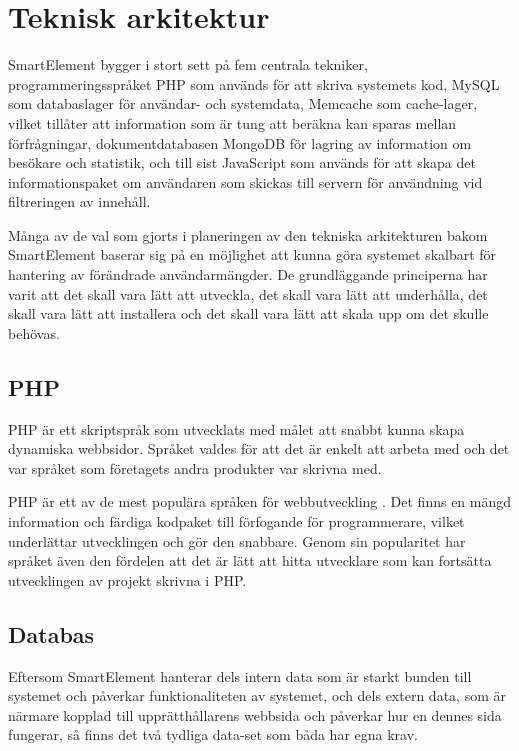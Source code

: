 \section{Teknisk arkitektur}

SmartElement bygger i stort sett på fem centrala tekniker, programmeringsspråket PHP som används för att skriva systemets kod, MySQL som databaslager för användar- och systemdata, Memcache som cache-lager, vilket tillåter att information som är tung att beräkna kan sparas mellan förfrågningar, dokumentdatabasen MongoDB för lagring av information om besökare och statistik, och till sist JavaScript som används för att skapa det informationspaket om användaren som skickas till servern för användning vid filtreringen av innehåll.

Många av de val som gjorts i planeringen av den tekniska arkitekturen bakom SmartElement baserar sig på en möjlighet att kunna göra systemet skalbart för hantering av förändrade användarmängder. De grundläggande principerna har varit att det skall vara lätt att utveckla, det skall vara lätt att underhålla, det skall vara lätt att installera och det skall vara lätt att skala upp om det skulle behövas.

\subsection{PHP}

PHP är ett skriptspråk som utvecklats med målet att snabbt kunna skapa dynamiska webbsidor. \citep{phpmanual} Språket valdes för att det är enkelt att arbeta med och det var språket som företagets andra produkter var skrivna med.

PHP är ett av de mest populära språken för webbutveckling \citep{tiobe}. Det finns en mängd information och färdiga kodpaket till förfogande för programmerare, vilket underlättar utvecklingen och gör den snabbare. Genom sin popularitet har språket även den fördelen att det är lätt att hitta utvecklare som kan fortsätta utvecklingen av projekt skrivna i PHP.

\subsection{Databas}

Eftersom SmartElement hanterar dels intern data som är starkt bunden till systemet och påverkar funktionaliteten av systemet, och dels extern data, som är närmare kopplad till upprätthållarens webbsida och påverkar hur en dennes sida fungerar, så finns det två tydliga data-set som båda har egna krav.

